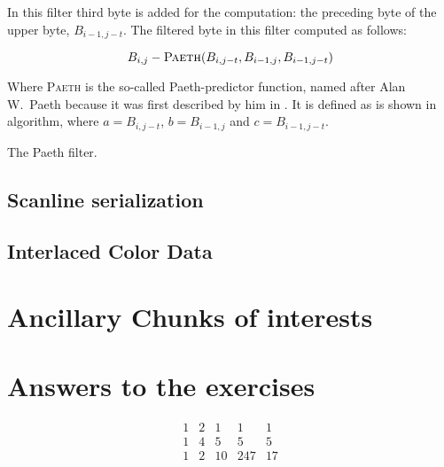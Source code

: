 In this filter third byte is added for the computation: the preceding
byte of the upper byte, $B_{i-1,j-t}$. The filtered byte in this
filter computed as follows:

\begin{equation*}
  B_{i,j} - \textsc{Paeth}(B_{i,j-t},B_{i-1,j},B_{i-1,j-t})
\end{equation*}

Where \textsc{Paeth} is the so-called Paeth-predictor function, named
after Alan W.~Paeth because it was first described by him in
\cite{arvo1994graphics_gems}. It is defined as is shown in algorithm,
where $a=B_{i,j-t}$, $b=B_{i-1,j}$ and $c=B_{i-1,j-t}$.


\begin{algorithm}[H]
  \caption{The Paeth filter.}
  \label{alg:paeth}
  \begin{algorithmic}[1]
    \State {}
    \State {}
    \Else
    \State {}
    \EndIf
    \EndProcedure
  \end{algorithmic}
\end{algorithm}


\subsection{Scanline serialization}

\subsection{Interlaced Color Data}

\section{Ancillary Chunks of interests}

\section{Answers to the exercises}

\begin{Answer}[ref={filter-1}]

\[
 \begin{matrix}
  1 & 2 & 1 & 1 & 1 \\
  1 & 4 & 5 & 5 & 5 \\
  1 & 2 & 10 & 247 & 17
 \end{matrix}
\]


\end{Answer}


